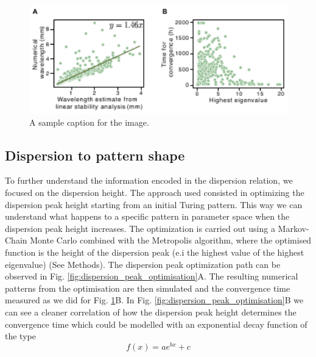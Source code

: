 \begin{figure}[H] %
    \centering
    \includegraphics[width=1\textwidth]{chapters/Chapter 1/dispersion_to_wavelength_convergence} %
    \caption{A sample caption for the image.}
    \label{fig:dispersion_to_wavelength_convergence} %
\end{figure}

\subsection{Dispersion to pattern shape}
To further understand the information encoded in the dispersion relation, we focused on the dispersion height.
The approach used consisted in optimizing the dispersion peak height starting from an initial Turing pattern.
This way we can understand what happens to a specific pattern in parameter space when the dispersion peak height increases.
The optimization is carried out using a Markov-Chain Monte Carlo combined with the Metropolis algorithm, where the optimised function is the height of the dispersion peak (e.i the highest value of the highest eigenvalue) (See Methods). %
The dispersion peak optimization path can be observed in Fig. \ref{fig:dispersion_peak_optimisation}A.
The resulting numerical patterns from the optimisation are then simulated and the convergence time measured as we did for Fig. \ref{fig:dispersion_to_wavelength_convergence}B. In Fig. \ref{fig:dispersion_peak_optimisation}B we can see a cleaner correlation of how the dispersion peak height determines the convergence time which could be modelled with an exponential decay function of the type
\begin{equation}
    f(x) = ae^{bx} + c
\end{equation}

